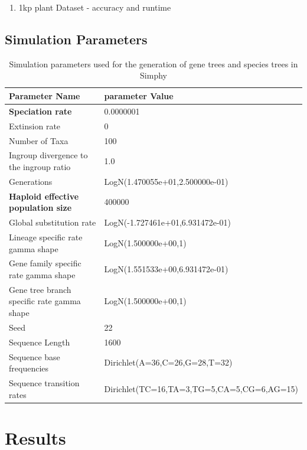 \documentclass[runningheads]{llncs}
\begin{document}
\begin{enumerate}
    \item 1kp plant Dataset - accuracy and runtime
\end{enumerate}

\subsection{Simulation Parameters}

\begin{table}[h!]
\centering

\begin{tabular}{|l|l|}
\hline
\textbf{Parameter Name} & \textbf{parameter Value} \\ \hline
\textbf{Speciation rate} & 0.0000001 \\ \hline
Extinsion rate & 0 \\ \hline
Number of Taxa & 100 \\ \hline
Ingroup divergence to the ingroup ratio & 1.0 \\ \hline
Generations & LogN(1.470055e+01,2.500000e-01) \\ \hline
\textbf{Haploid effective population size} & 400000 \\ \hline
Global substitution rate & LogN(-1.727461e+01,6.931472e-01) \\ \hline
Lineage specific rate gamma shape & LogN(1.500000e+00,1) \\ \hline
Gene family specific rate gamma shape & LogN(1.551533e+00,6.931472e-01) \\ \hline
Gene tree branch specific rate gamma shape & LogN(1.500000e+00,1) \\ \hline
Seed & 22 \\ \hline
Sequence Length & 1600 \\ \hline
Sequence base frequencies & Dirichlet(A=36,C=26,G=28,T=32) \\ \hline
Sequence transition rates & Dirichlet(TC=16,TA=3,TG=5,CA=5,CG=6,AG=15) \\ \hline
\end{tabular}
\vspace{6pt}
\caption{Simulation parameters used for the generation of gene trees and species trees in Simphy}
\label{tab:simphy-params}

\end{table}


\section{Results}
\end{document}
